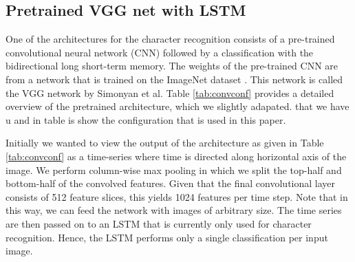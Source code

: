 \subsection{Pretrained VGG net with LSTM}
\label{sec:vgg}
One of the architectures for the character recognition consists of a pre-trained convolutional neural network (CNN) followed by a classification with the bidirectional long short-term memory. The weights of the pre-trained CNN are from a network that is trained on the ImageNet dataset \cite{simonyan2014very}. This network is called the VGG network by Simonyan et al. Table \ref{tab:convconf} provides a detailed overview of the pretrained architecture, which we slightly adapated. that we have u and in table  is show the configuration that is used in this paper.

Initially we wanted to view the output of the architecture as given in Table \ref{tab:convconf} as a time-series where time is directed along horizontal axis of the image. We perform column-wise max pooling in which we split the top-half and bottom-half of the convolved features. Given that the final convolutional layer consists of 512 feature slices, this yields 1024 features per time step. Note that in this way, we can feed the network with images of arbitrary size. The time series are then passed on to an LSTM that is currently only used for character recognition. Hence, the LSTM performs only a single classification per input image.

